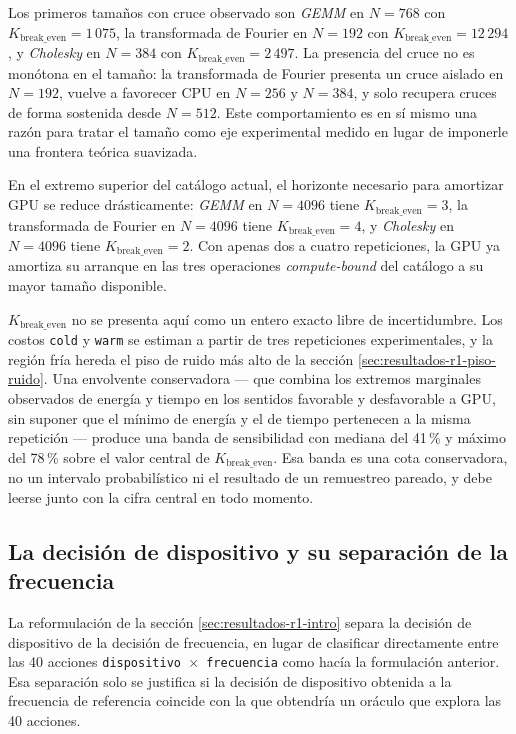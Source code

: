 \documentclass[12pt,oneside,spanish]{book}
\begin{document}
Los primeros tamaños con cruce observado son \textit{GEMM} en $N=768$ con $K_{\text{break\_even}}=1\,075$, la transformada de Fourier en $N=192$ con $K_{\text{break\_even}}=12\,294$, y \textit{Cholesky} en $N=384$ con $K_{\text{break\_even}}=2\,497$. La presencia del cruce no es monótona en el tamaño: la transformada de Fourier presenta un cruce aislado en $N=192$, vuelve a favorecer CPU en $N=256$ y $N=384$, y solo recupera cruces de forma sostenida desde $N=512$. Este comportamiento es en sí mismo una razón para tratar el tamaño como eje experimental medido en lugar de imponerle una frontera teórica suavizada.

En el extremo superior del catálogo actual, el horizonte necesario para amortizar GPU se reduce drásticamente: \textit{GEMM} en $N=4096$ tiene $K_{\text{break\_even}}=3$, la transformada de Fourier en $N=4096$ tiene $K_{\text{break\_even}}=4$, y \textit{Cholesky} en $N=4096$ tiene $K_{\text{break\_even}}=2$. Con apenas dos a cuatro repeticiones, la GPU ya amortiza su arranque en las tres operaciones \textit{compute-bound} del catálogo a su mayor tamaño disponible.

$K_{\text{break\_even}}$ no se presenta aquí como un entero exacto libre de incertidumbre. Los costos \texttt{cold} y \texttt{warm} se estiman a partir de tres repeticiones experimentales, y la región fría hereda el piso de ruido más alto de la sección \ref{sec:resultados-r1-piso-ruido}. Una envolvente conservadora --- que combina los extremos marginales observados de energía y tiempo en los sentidos favorable y desfavorable a GPU, sin suponer que el mínimo de energía y el de tiempo pertenecen a la misma repetición --- produce una banda de sensibilidad con mediana del 41\,\% y máximo del 78\,\% sobre el valor central de $K_{\text{break\_even}}$. Esa banda es una cota conservadora, no un intervalo probabilístico ni el resultado de un remuestreo pareado, y debe leerse junto con la cifra central en todo momento.

\subsection{La decisión de dispositivo y su separación de la frecuencia}
\label{sec:resultados-r1-dispositivo}

La reformulación de la sección \ref{sec:resultados-r1-intro} separa la decisión de dispositivo de la decisión de frecuencia, en lugar de clasificar directamente entre las 40 acciones \texttt{dispositivo $\times$ frecuencia} como hacía la formulación anterior. Esa separación solo se justifica si la decisión de dispositivo obtenida a la frecuencia de referencia coincide con la que obtendría un oráculo que explora las 40 acciones.
\end{document}
